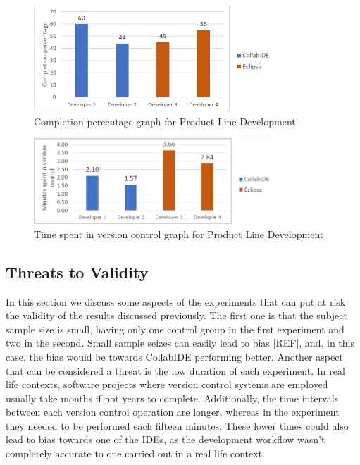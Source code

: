 \begin{figure}[htbp]
  \centering
  \includegraphics[width=0.8\textwidth]{img/completionProductLine}
  \caption{Completion percentage graph for Product Line Development}
  \label{fig:completionProductLine}
\end{figure}

\begin{figure}[htbp]
  \centering
  \includegraphics[width=0.8\textwidth]{img/versionControlProductLine}
  \caption{Time spent in version control graph for Product Line Development}
  \label{fig:versionControlProductLine}
\end{figure}

\subsection{Threats to Validity}
In this section we discuss some aspects of the experiments that can put at risk the validity of the results discussed previously. The first one is that the subject sample size is small, having only one control group in the first experiment and two in the second. Small sample seizes can easily lead to bias [REF], and, in this case, the bias would be towards CollabIDE performing better. Another aspect that can be considered a threat is the low duration of each experiment. In real life contexts, software projects where version control systems are employed usually take months if not years to complete. Additionally, the time intervals between each version control operation are longer, whereas in the experiment they needed to be performed each fifteen minutes. These lower times could also lead to bias towards one of the IDEs, as the development workflow wasn’t completely accurate to one carried out in a real life context. 


\endinput
